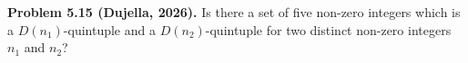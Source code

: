 \textbf{Problem 5.15 (Dujella, 2026).} Is there a set of five non-zero integers which is a $D(n_1)$-quintuple and a $D(n_2)$-quintuple for two distinct non-zero integers $n_1$ and $n_2$?
